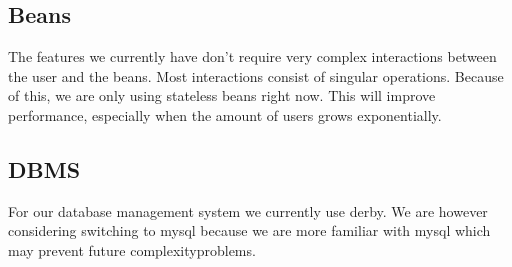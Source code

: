 \documentclass{article}
\begin{document}
\subsection{Beans}
The features we currently have don't require very complex interactions between the user and the beans. Most interactions consist of singular operations. Because of this, we are only using stateless beans right now. This will improve performance, especially when the amount of users grows exponentially.
\subsection{DBMS}
For our database management system we currently use derby. We are however considering switching to mysql because we are more familiar with mysql which may prevent future complexityproblems.
\end{document}
